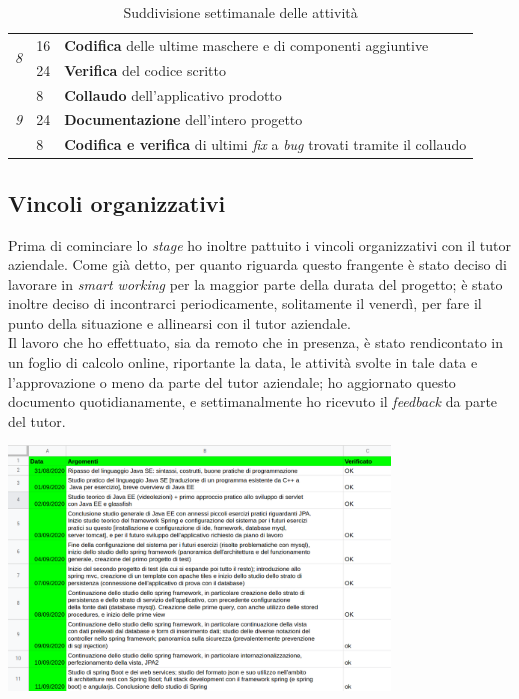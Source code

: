 \begin{table}[h]
\begin{tabularx}{\textwidth}{|l|l|X|}
  \multirow{2}{*}{\textit{8}} & 16           & \textbf{Codifica} delle ultime maschere e di componenti aggiuntive           \\ \cline{2-3}
                              & 24           & \textbf{Verifica} del codice scritto                  \\ \hline
  \multirow{3}{*}{\textit{9}} & 8            & \textbf{Collaudo} dell'applicativo prodotto                  \\ \cline{2-3}
                              & 24           & \textbf{Documentazione} dell'intero progetto            \\ \cline{2-3}
                              & 8            & \textbf{Codifica e verifica} di ultimi \textit{fix} a \textit{bug} trovati tramite il collaudo                \\ \hline
  \end{tabularx}
  \caption{Suddivisione settimanale delle attività}
\end{table}

\subsection{Vincoli organizzativi}

Prima di cominciare lo \textit{stage} ho inoltre pattuito i vincoli organizzativi con il tutor aziendale. Come già detto, per quanto riguarda questo frangente è stato deciso di lavorare in \textit{smart working} per la maggior parte della durata del progetto; è stato inoltre deciso di incontrarci periodicamente, solitamente il venerdì, per fare il punto della situazione e allinearsi con il tutor aziendale. \\
Il lavoro che ho effettuato, sia da remoto che in presenza, è stato rendicontato in un foglio di calcolo online, riportante la data, le attività svolte in tale data e l'approvazione o meno da parte del tutor aziendale; ho aggiornato questo documento quotidianamente, e settimanalmente ho ricevuto il \textit{feedback} da parte del tutor. \\

\begin{minipage}{\linewidth}
  \centering
    \includegraphics[height=6.5cm]{immagini/drive}
\end{minipage} \\


